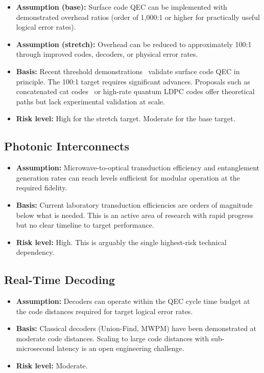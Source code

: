 \documentclass[conference]{IEEEtran}
\begin{document}
\begin{itemize}
\item \textbf{Assumption (base):} Surface code QEC can be implemented with demonstrated overhead ratios (order of 1,000:1 or higher for practically useful logical error rates).
\item \textbf{Assumption (stretch):} Overhead can be reduced to approximately 100:1 through improved codes, decoders, or physical error rates.
\item \textbf{Basis:} Recent threshold demonstrations~\cite{googleqai2024, bravyi2024} validate surface code QEC in principle. The 100:1 target requires significant advances. Proposals such as concatenated cat codes~\cite{chamberland2022} or high-rate quantum LDPC codes offer theoretical paths but lack experimental validation at scale.
\item \textbf{Risk level:} High for the stretch target. Moderate for the base target.
\end{itemize}

\subsection{Photonic Interconnects}

\begin{itemize}
\item \textbf{Assumption:} Microwave-to-optical transduction efficiency and entanglement generation rates can reach levels sufficient for modular operation at the required fidelity.
\item \textbf{Basis:} Current laboratory transduction efficiencies are orders of magnitude below what is needed. This is an active area of research with rapid progress but no clear timeline to target performance.
\item \textbf{Risk level:} High. This is arguably the single highest-risk technical dependency.
\end{itemize}

\subsection{Real-Time Decoding}

\begin{itemize}
\item \textbf{Assumption:} Decoders can operate within the QEC cycle time budget at the code distances required for target logical error rates.
\item \textbf{Basis:} Classical decoders (Union-Find, MWPM) have been demonstrated at moderate code distances. Scaling to large code distances with sub-microsecond latency is an open engineering challenge.
\item \textbf{Risk level:} Moderate.
\end{itemize}
\end{document}
